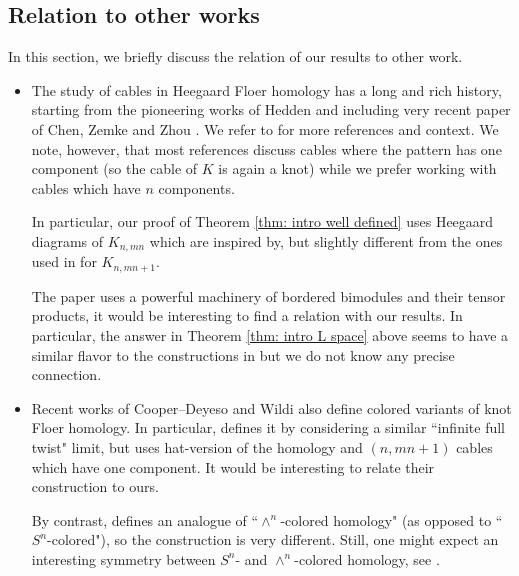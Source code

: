\documentclass{amsart}
\newcommand{\CA}{\mathcal{A}}
\begin{document}



\subsection{Relation to other works}

In this section, we briefly discuss the relation of our results to other work.

\begin{itemize}
\item[(1)] The study of cables in Heegaard Floer homology has a long and rich history, starting from the pioneering works of Hedden \cite{Hedden, Hedden2} and including very recent paper of Chen, Zemke and Zhou \cite{Chen}. We refer to \cite{Chen} for more references and context.
We note, however, that most references discuss cables where the pattern has one component (so the cable of $K$ is again a knot) while we prefer working with cables which have $n$ components.

In particular, our proof of Theorem \ref{thm: intro well defined} uses Heegaard diagrams of $K_{n,mn}$ which are inspired by, but slightly different from the ones used in \cite{Hedden} for $K_{n,mn+1}$.

The paper \cite{Chen} uses a powerful machinery of bordered bimodules \cite{Zemke:bordered} and their tensor products, it would be interesting to find a relation with our results. In particular, the answer in Theorem \ref{thm: intro L space} above seems to have a similar flavor to the constructions in  \cite{Chen} but we do not know any precise connection.

\item[(2)] Recent works of Cooper--Deyeso \cite{Cooper} and Wildi \cite{Wildi} also define colored variants of knot Floer homology. In particular, \cite[Corollary 4.6]{Cooper} defines it by considering a similar ``infinite full twist" limit, but uses hat-version of the homology and $(n,mn+1)$ cables which have one component. It would be interesting to relate their construction to ours.

By contrast, \cite{Wildi} defines an analogue of ``$\wedge^n$-colored homology" (as opposed to ``$S^n$-colored"), so the construction is very different. Still, one might expect an interesting symmetry between $S^n$- and $\wedge^n$-colored homology, see \cite{Conners}. 
\end{itemize}
 
\end{document}
